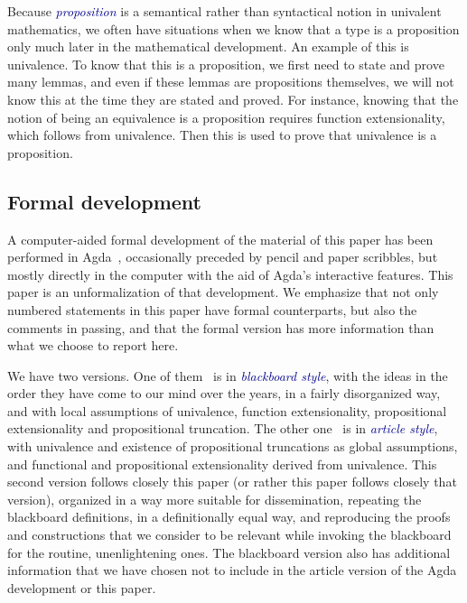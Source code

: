 \documentclass[10pt]{article}
\newcommand{\db}{\textcolor{darkblue}}
\newcommand{\df}[1]{\emph{\db{#1}}}
\theoremstyle{definition}
\begin{document}
\begin{enumerate}
  Because \df{proposition} is a semantical rather than syntactical
  notion in univalent mathematics, we often have situations when we
  know that a type is a proposition only much later in the
  mathematical development. An example of this is univalence. To know
  that this is a proposition, we first need to state and prove many
  lemmas, and even if these lemmas are propositions themselves, we
  will not know this at the time they are stated and proved. For
  instance, knowing that the notion of being an equivalence is a
  proposition requires function extensionality, which follows from
  univalence. Then this is used to prove that univalence is a
  proposition.

\end{enumerate}

\subsection{Formal development}

A computer-aided formal development of the material of this paper has
been performed in Agda~\cite{agda}, occasionally preceded by pencil
and paper scribbles, but mostly directly in the computer with the aid
of Agda's interactive features. This paper is an unformalization of
that development. We emphasize that not only numbered statements in
this paper have formal counterparts, but also the comments in passing,
and that the formal version has more information than what we
choose to report here.

We have two versions. One of them~\cite{injective:blackboard} is in
\df{blackboard style}, with the ideas in the order they have come to
our mind over the years, in a fairly disorganized way, and with local
assumptions of univalence, function extensionality, propositional
extensionality and propositional truncation. The other
one~\cite{injective:article} is in \df{article style}, with univalence
and existence of propositional truncations as global assumptions, and
functional and propositional extensionality derived from
univalence. This second version follows closely this paper (or rather
this paper follows closely that version), organized in a way more
suitable for dissemination, repeating the blackboard definitions, in a
definitionally equal way, and reproducing the proofs and constructions
that we consider to be relevant while invoking the blackboard for the
routine, unenlightening ones. The blackboard version also has
additional information that we have chosen not to include in the
article version of the Agda development or this paper.
\end{document}
